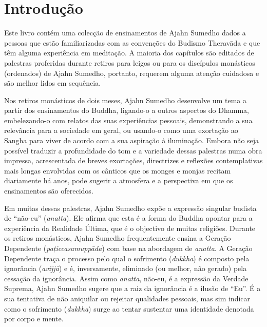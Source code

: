\chapter{Introdução}

Este livro contém uma colecção de ensinamentos de Ajahn Sumedho dados a pessoas
que estão familiarizadas com as convenções do Budismo Theravāda e que têm alguma
experiência em meditação. A maioria dos capítulos são editados de palestras
proferidas durante retiros para leigos ou para os discípulos monásticos
(ordenados) de Ajahn Sumedho, portanto, requerem alguma atenção cuidadosa e são
melhor lidos em sequência.

Nos retiros monásticos de dois meses, Ajahn Sumedho desenvolve um tema a partir
dos ensinamentos do Buddha, ligando-o a outros aspectos do Dhamma, embelezando-o
com relatos das suas experiências pessoais, demonstrando a sua relevância para a
sociedade em geral, ou usando-o como uma exortação ao Sangha para viver de
acordo com a sua aspiração à iluminação. Embora não seja possível traduzir a
profundidade do tom e a variedade dessas palestras numa obra impressa,
acrescentada de breves exortações, directrizes e reflexões contemplativas mais
longas envolvidas com os cânticos que os monges e monjas recitam diariamente há
anos, pode sugerir a atmosfera e a perspectiva em que os ensinamentos são
oferecidos.

Em muitas dessas palestras, Ajahn Sumedho expõe a expressão singular budista de
``não-eu'' (\emph{anatta}). Ele afirma que esta é a forma do Buddha apontar para
a experiência da Realidade Última, que é o objectivo de muitas religiões.
Durante os retiros monásticos, Ajahn Sumedho frequentemente ensina a Geração
Dependente (\emph{paṭiccasamuppāda}) com base na abordagem de \emph{anatta}. A
Geração Dependente traça o processo pelo qual o sofrimento (\emph{dukkha}) é
composto pela ignorância (\emph{avijjā}) e é, inversamente, eliminado (ou
melhor, não gerado) pela cessação da ignorância. Assim como \emph{anatta},
não-eu, é a expressão da Verdade Suprema, Ajahn Sumedho sugere que a raiz da
ignorância é a ilusão de ``Eu''. É a sua tentativa de não aniquilar ou rejeitar
qualidades pessoais, mas sim indicar como o sofrimento (\emph{dukkha}) surge ao
tentar sustentar uma identidade denotada por corpo e mente.

